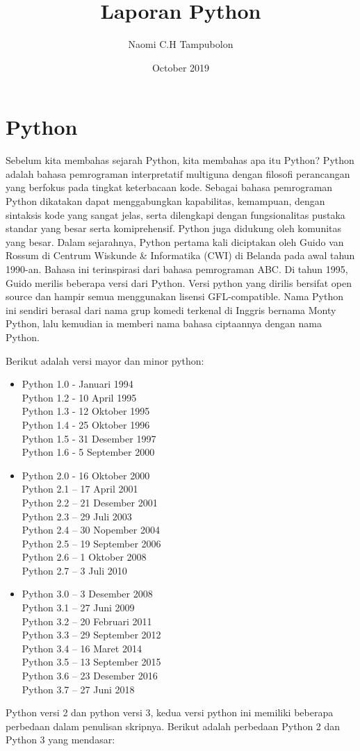 \documentclass{article}
\title{Laporan Python}
\author{Naomi C.H Tampubolon }
\date{October 2019}
\begin{document}
\maketitle

\section{Python}
Sebelum kita  membahas sejarah Python, kita membahas apa itu Python? Python adalah bahasa pemrograman interpretatif multiguna dengan filosofi perancangan yang berfokus pada tingkat keterbacaan kode. Sebagai bahasa pemrograman Python dikatakan dapat menggabungkan kapabilitas, kemampuan, dengan sintaksis kode yang sangat jelas, serta dilengkapi dengan fungsionalitas pustaka standar yang besar serta komiprehensif. Python juga didukung oleh komunitas yang besar.
Dalam sejarahnya, Python pertama kali diciptakan oleh Guido van Rossum di Centrum Wiskunde & Informatika (CWI) di Belanda pada awal tahun 1990-an.  Bahasa ini terinspirasi dari bahasa pemrograman ABC. Di tahun 1995, Guido merilis beberapa versi dari Python. Versi python yang dirilis bersifat open source dan hampir semua menggunakan lisensi GFL-compatible. Nama Python ini sendiri berasal dari nama grup komedi terkenal di Inggris bernama Monty Python, lalu kemudian ia memberi nama bahasa ciptaannya dengan nama Python.

Berikut adalah versi mayor dan minor python:
\begin{itemize}
\item Python 1.0 - Januari  1994\\
Python 1.2 - 10 April 1995\\
Python 1.3 - 12 Oktober 1995\\
Python 1.4 - 25 Oktober 1996\\
Python 1.5 - 31 Desember 1997\\
Python 1.6 - 5 September 2000
\item Python 2.0 - 16 Oktober 2000\\
Python 2.1 – 17 April 2001\\
Python 2.2 – 21 Desember 2001\\
Python 2.3 – 29 Juli 2003\\
Python 2.4 – 30 Nopember 2004\\
Python 2.5 – 19 September 2006\\
Python 2.6 – 1 Oktober 2008\\
Python 2.7 – 3 Juli 2010
\item Python 3.0 – 3 Desember 2008\\
Python 3.1 – 27 Juni 2009\\
Python 3.2 – 20 Februari 2011\\
Python 3.3 – 29 September 2012\\
Python 3.4 – 16 Maret 2014\\
Python 3.5 – 13 September 2015\\
Python 3.6 – 23 Desember 2016\\
Python 3.7 – 27 Juni 2018
\end{itemize}
Python versi 2 dan python versi 3, kedua versi python ini memiliki beberapa perbedaan dalam penulisan skripnya. Berikut adalah perbedaan Python 2 dan Python 3 yang mendasar:
\end{document}
